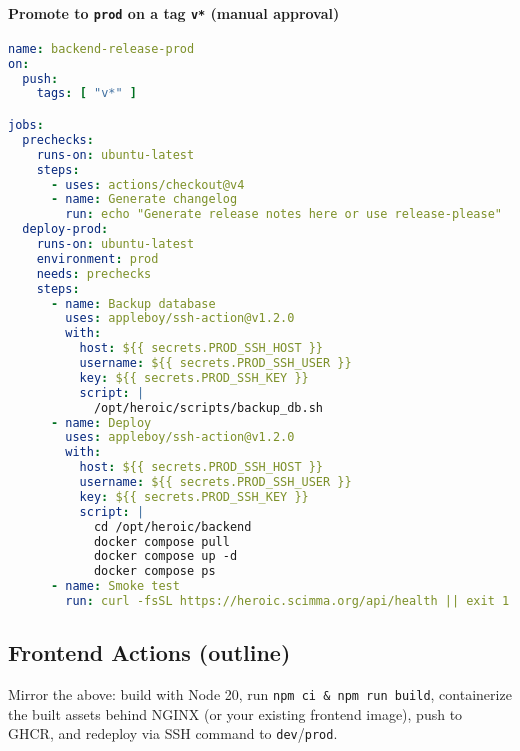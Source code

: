 \documentclass[11pt]{article}
\begin{document}
\paragraph{Promote to \texttt{prod} on a tag \texttt{v*} (manual approval)}
\begin{lstlisting}[language=YAML]
name: backend-release-prod
on:
  push:
    tags: [ "v*" ]

jobs:
  prechecks:
    runs-on: ubuntu-latest
    steps:
      - uses: actions/checkout@v4
      - name: Generate changelog
        run: echo "Generate release notes here or use release-please"
  deploy-prod:
    runs-on: ubuntu-latest
    environment: prod
    needs: prechecks
    steps:
      - name: Backup database
        uses: appleboy/ssh-action@v1.2.0
        with:
          host: ${{ secrets.PROD_SSH_HOST }}
          username: ${{ secrets.PROD_SSH_USER }}
          key: ${{ secrets.PROD_SSH_KEY }}
          script: |
            /opt/heroic/scripts/backup_db.sh
      - name: Deploy
        uses: appleboy/ssh-action@v1.2.0
        with:
          host: ${{ secrets.PROD_SSH_HOST }}
          username: ${{ secrets.PROD_SSH_USER }}
          key: ${{ secrets.PROD_SSH_KEY }}
          script: |
            cd /opt/heroic/backend
            docker compose pull
            docker compose up -d
            docker compose ps
      - name: Smoke test
        run: curl -fsSL https://heroic.scimma.org/api/health || exit 1
\end{lstlisting}

\subsection*{Frontend Actions (outline)}
Mirror the above: build with Node 20, run \texttt{npm ci \& npm run build}, containerize the built assets behind NGINX (or your existing frontend image), push to GHCR, and redeploy via SSH command to \texttt{dev}/\texttt{prod}.
\end{document}
